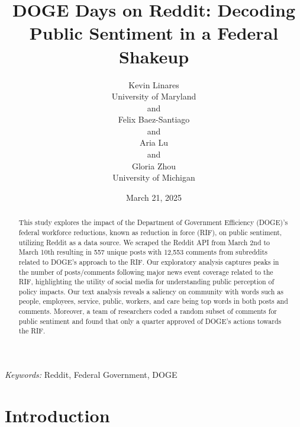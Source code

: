 \documentclass[
  12pt]{article}
\begin{document}
\def\spacingset#1{\renewcommand{\baselinestretch}%
{#1}\small\normalsize} \spacingset{1}



\date{March 21, 2025}
\title{\bf DOGE Days on Reddit: Decoding Public Sentiment in a Federal
Shakeup}
\author{
Kevin Linares\\
University of Maryland\\
and\\Felix Baez-Santiago\\
and\\Aria Lu\\
and\\Gloria Zhou\\
University of Michigan\\
}
\maketitle

\bigskip
\bigskip
\begin{abstract}
This study explores the impact of the Department of Government
Efficiency (DOGE)'s federal workforce reductions, known as reduction in
force (RIF), on public sentiment, utilizing Reddit as a data source. We
scraped the Reddit API from March 2nd to March 10th resulting in 557
unique posts with 12,553 comments from subreddits related to DOGE's
approach to the RIF. Our exploratory analysis captures peaks in the
number of posts/comments following major news event coverage related to
the RIF, highlighting the utility of social media for understanding
public perception of policy impacts. Our text analysis reveals a
saliency on community with words such as people, employees, service,
public, workers, and care being top words in both posts and comments.
Moreover, a team of researchers coded a random subset of comments for
public sentiment and found that only a quarter approved of DOGE's
actions towards the RIF.
\end{abstract}

\noindent%
{\it Keywords:} Reddit, Federal Government, DOGE
\vfill

\newpage
\spacingset{1.9} %


\section{Introduction}\label{sec-intro}
\end{document}
